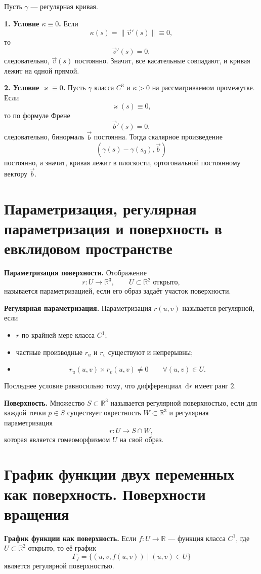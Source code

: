 \documentclass[12pt,a4paper]{article}
\newcommand{\R}{\mathbb{R}}
\newcommand{\dd}{\,\mathrm{d}}
\begin{document}
Пусть $\gamma$ --- регулярная кривая.

\textbf{1. Условие $\kappa\equiv 0$.}
Если
\[
\kappa(s)=\|\vec{v}'(s)\|\equiv 0,
\]
то
\[
\vec{v}'(s)=0,
\]
следовательно, $\vec{v}(s)$ постоянно.
Значит, все касательные совпадают, и кривая лежит на одной прямой.

\textbf{2. Условие $\varkappa\equiv 0$.}
Пусть $\gamma$ класса $C^3$ и $\kappa>0$ на рассматриваемом промежутке.
Если
\[
\varkappa(s)\equiv 0,
\]
то по формуле Френе
\[
\vec{b}'(s)=0,
\]
следовательно, бинормаль $\vec{b}$ постоянна.
Тогда скалярное произведение
\[
(\gamma(s)-\gamma(s_0),\vec{b})
\]
постоянно, а значит, кривая лежит в плоскости, ортогональной постоянному вектору $\vec{b}$.

\section{Параметризация, регулярная параметризация и поверхность в евклидовом пространстве}

\textbf{Параметризация поверхности.}
Отображение
\[
r:U\to \R^3,
\qquad U\subset \R^2 \text{ открыто},
\]
называется параметризацией, если его образ задаёт участок поверхности.

\textbf{Регулярная параметризация.}
Параметризация $r(u,v)$ называется регулярной, если
\begin{itemize}
  \item $r$ по крайней мере класса $C^1$;
  \item частные производные $r_u$ и $r_v$ существуют и непрерывны;
  \item
  \[
  r_u(u,v)\times r_v(u,v)\neq 0
  \qquad \forall (u,v)\in U.
  \]
\end{itemize}
Последнее условие равносильно тому, что дифференциал $\dd r$ имеет ранг $2$.

\textbf{Поверхность.}
Множество $S\subset \R^3$ называется регулярной поверхностью, если для каждой
точки $p\in S$ существует окрестность $W\subset \R^3$ и регулярная параметризация
\[
r:U\to S\cap W,
\]
которая является гомеоморфизмом $U$ на свой образ.

\section{График функции двух переменных как поверхность. Поверхности вращения}

\textbf{График функции как поверхность.}
Если $f:U\to \R$ --- функция класса $C^1$, где $U\subset \R^2$ открыто, то её график
\[
\Gamma_f=\{(u,v,f(u,v))\mid (u,v)\in U\}
\]
является регулярной поверхностью.
\end{document}
